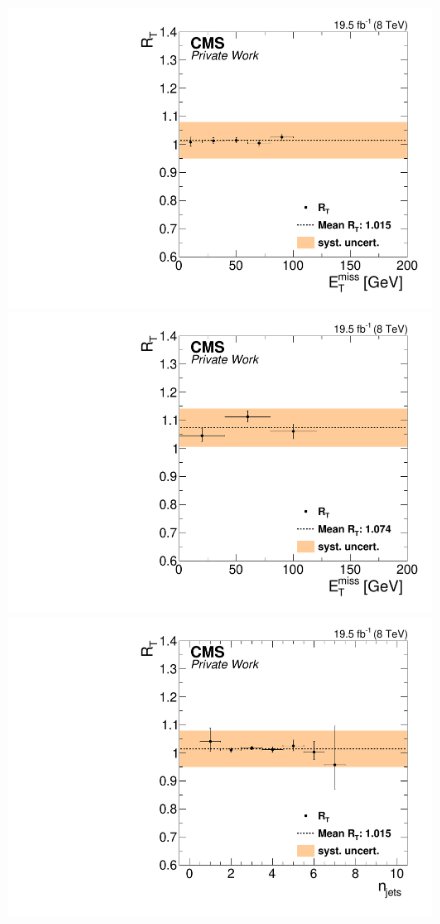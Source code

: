 \begin{figure}[htbp]
\begin{minipage}[t]{0.49\textwidth}
  \includegraphics[width=\textwidth]{plots/BG/trigger/Triggereff_SFvsOF_Syst_AlphaT_HighHTExclusiveCentral_Full2012_MET_None.pdf}
\end{minipage}
\begin{minipage}[t]{0.49\textwidth}
\includegraphics[width=\textwidth]{plots/BG/trigger/Triggereff_SFvsOF_Syst_AlphaT_HighHTExclusiveForward_Full2012_MET_None.pdf}
\end{minipage}
\begin{minipage}[t]{0.49\textwidth}
  \includegraphics[width=\textwidth]{plots/BG/trigger/Triggereff_SFvsOF_Syst_AlphaT_HighHTExclusiveCentral_Full2012_NJets_None.pdf}

\end{minipage}
\end{figure}
